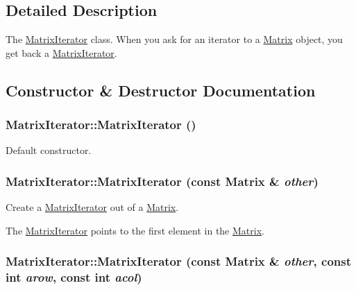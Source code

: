 \subsection{Detailed Description}
The \hyperlink{class_matrix_iterator}{MatrixIterator} class. When you ask for an iterator to a \hyperlink{class_matrix}{Matrix} object, you get back a \hyperlink{class_matrix_iterator}{MatrixIterator}. 

\subsection{Constructor \& Destructor Documentation}
\hypertarget{class_matrix_iterator_af6e88a1b0212e5dae1b9653f2656d998}{
\subsubsection[{MatrixIterator}]{\setlength{\rightskip}{0pt plus 5cm}MatrixIterator::MatrixIterator ()}}
\label{class_matrix_iterator_af6e88a1b0212e5dae1b9653f2656d998}


Default constructor. 

\hypertarget{class_matrix_iterator_a662eef6bd5137162f18cb910a1c7bf40}{
\subsubsection[{MatrixIterator}]{\setlength{\rightskip}{0pt plus 5cm}MatrixIterator::MatrixIterator (const {\bf Matrix} \& {\em other})}}
\label{class_matrix_iterator_a662eef6bd5137162f18cb910a1c7bf40}


Create a \hyperlink{class_matrix_iterator}{MatrixIterator} out of a \hyperlink{class_matrix}{Matrix}. 

The \hyperlink{class_matrix_iterator}{MatrixIterator} points to the first element in the \hyperlink{class_matrix}{Matrix}. \hypertarget{class_matrix_iterator_afb1bb1d080d0a59fe88a1d875a4bca5d}{
\subsubsection[{MatrixIterator}]{\setlength{\rightskip}{0pt plus 5cm}MatrixIterator::MatrixIterator (const {\bf Matrix} \& {\em other}, \/  const int {\em arow}, \/  const int {\em acol})}}
\label{class_matrix_iterator_afb1bb1d080d0a59fe88a1d875a4bca5d}


